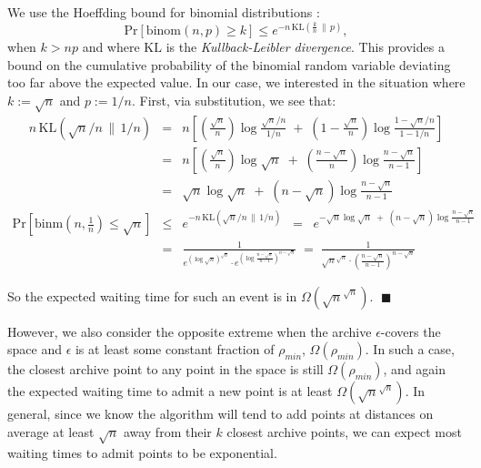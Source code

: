 \documentclass[twoside]{article}
\newcommand{\PPr}[1]{\mathrm{Pr}\left[#1\right]}
\newcommand{\KL}[2]{\mathrm{KL}\left(#1\,\|\,#2\right)}
\begin{document}
We use the Hoeffding bound for binomial distributions \citep{Hoeffding1963jasa}:
%
\[
  \PPr{\mathrm{binom}\left(n,p\right) \geq k} \leq e^{-n\,\KL{\frac{k}{n}}{p}},
\]
%
\noindent when $k > np$ and where $\mathrm{KL}$ is the \emph{Kullback-Leibler divergence}.  This provides a bound on the cumulative probability of the binomial random variable deviating too far above the expected value.  In our case, we interested in the situation where $k:=\sqrt{n}$ and $p:=1/n$.  First, via substitution, we see that:
%
\begin{eqnarray*}
  n\,\KL{\sqrt{n}/n}{1/n} & =  & n\left[ \left(  \frac{\sqrt{n}}{n}\right)\log \frac{\sqrt{n}/n}{1/n} \; + \;
                                        \left(1-\frac{\sqrt{n}}{n}\right)\log \frac{1-\sqrt{n}/n}{1-1/n} \right] \\
                         & =  & n\left[ \left(  \frac{\sqrt{n}}{n}\right)\log  \sqrt{n} \; + \;
                                        \left(\frac{n-\sqrt{n}}{n}\right)\log \frac{n-\sqrt{n}}{n-1} \right] \\
                         & =  & \sqrt{n}\log \sqrt{n} \; + \; \left(n-\sqrt{n}\right)\log \frac{n-\sqrt{n}}{n-1} 
\end{eqnarray*}
%
\begin{eqnarray*}
  \PPr{\mathrm{binm}\left(n,\frac{1}{n}\right) \leq \sqrt{n}} 
        & \leq & e^{-n\,\KL{\sqrt{n}/n}{1/n}}  
               \;\;=\;\; e^{-\sqrt{n}\log \sqrt{n} \; + \; \left(n-\sqrt{n}\right)\log \frac{n-\sqrt{n}}{n-1}} \\
        & =    & \frac{1}{e^{\left(\log \sqrt{n}              \right)^{  \sqrt{n}} }  \cdot 
                          e^{\left(\log \frac{n-\sqrt{n}}{n-1}\right)^{n-\sqrt{n}} }  } 
                        \;=\; \frac{1}{\sqrt{n}^{  \sqrt{n}} \cdot 
                          \left(\frac{n-\sqrt{n}}{n-1}\right)^{n-\sqrt{n}}  } 
\end{eqnarray*}

\noindent So the expected waiting time for such an event is in $\Omega\left(\sqrt{n}^{\sqrt{n}}\right)$. $\;\blacksquare$

\vspace*{1ex}

However, we also consider the opposite extreme when the archive $\epsilon$-covers the space and $\epsilon$ is at least some constant fraction of $\rho_{min}$, $\Omega(\rho_{min})$.  In such a case, the closest archive point to any point in the space is still $\Omega(\rho_{min})$, and again the expected waiting time to admit a new point is at least $\Omega(\sqrt{n}^{\sqrt{n}})$.  In general, since we know the algorithm will tend to add points at distances on average at least $\sqrt{n}$ away from their $k$ closest archive points, we can expect most waiting times to admit points to be exponential.
\end{document}
